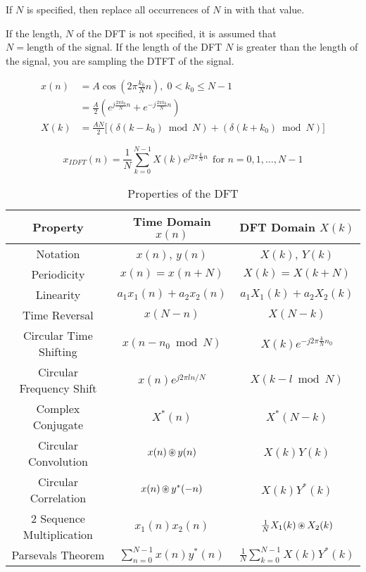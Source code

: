 If $N$ is specified, then replace all occurrences of $N$ in  with that value.

\begin{remark}
  If the length, $N$ of the DFT is not specified, it is assumed that $N = \text{length of the signal}$.
  If the length of the DFT $N$ is greater than the length of the signal, you are sampling the DTFT of the signal.
\end{remark}
\begin{equation}\label{eq:DFT_of_Cosine}
  \begin{aligned}
    x(n) &= A \cos \left( 2\pi \frac{k_{0}}{N} n \right),\; 0 < k_{0} \leq N-1 \\
    &= \frac{A}{2} \left( e^{j \frac{2\pi k_{0}}{N} n} + e^{-j \frac{2\pi k_{0}}{N} n} \right) \\
    X(k) &= \frac{AN}{2} \biggl[ (\delta(k-k_{0}) \bmod N) + (\delta(k+k_{0}) \bmod N) \biggr]
  \end{aligned}
\end{equation}


\begin{equation}\label{eq:IDFT}
  x_{IDFT}(n) = \frac{1}{N} \sum\limits_{k=0}^{N-1} X(k) e^{j 2\pi \frac{k}{N} n} \:\: \text{for } n = 0, 1, \ldots, N-1
\end{equation}

\begin{table}[h!]
  \centering
  \begin{tabular}{ccc}
    \toprule
    Property & Time Domain $x(n)$ & DFT Domain $X(k)$ \\
    \midrule
    Notation & $x(n)$, $y(n)$ & $X(k)$, $Y(k)$ \\
    Periodicity & $x(n) = x(n+N)$ & $X(k) = X(k+N)$ \\
    Linearity & $a_{1}x_{1}(n) + a_{2}x_{2}(n)$ & $a_{1}X_{1}(k) + a_{2}X_{2}(k)$ \\
    Time Reversal & $x(N-n)$ & $X(N-k)$ \\
    Circular Time Shifting & $x(n - n_{0} \bmod N)$ & $X(k) e^{-j 2\pi \frac{k}{N} n_{0}} $ \\
    Circular Frequency Shift & $x(n)e^{j2\pi l n/N}$ & $X(k-l \bmod N)$ \\
    Complex Conjugate & $X^{*}(n)$ & $X^{*}(N-k)$ \\
    Circular Convolution & $x(n) \operatorname{\circledast} y(n)$ & $X(k)Y(k)$ \\
    Circular Correlation & $x(n) \operatorname{\circledast} y^{*}(-n)$ & $X(k)Y^{*}(k)$ \\
    2 Sequence Multiplication & $x_{1}(n)x_{2}(n)$ & $\frac{1}{N} X_{1}(k) \operatorname{\circledast} X_{2}(k)$ \\
    Parsevals Theorem & $\sum\limits_{n=0}^{N-1} x(n) y^{*}(n)$ & $\frac{1}{N} \sum\limits_{k=0}^{N-1} X(k)Y^{*}(k)$ \\
    \bottomrule
  \end{tabular}
  \caption{Properties of the DFT}
  \label{tab:DFT_Properties}
\end{table}

